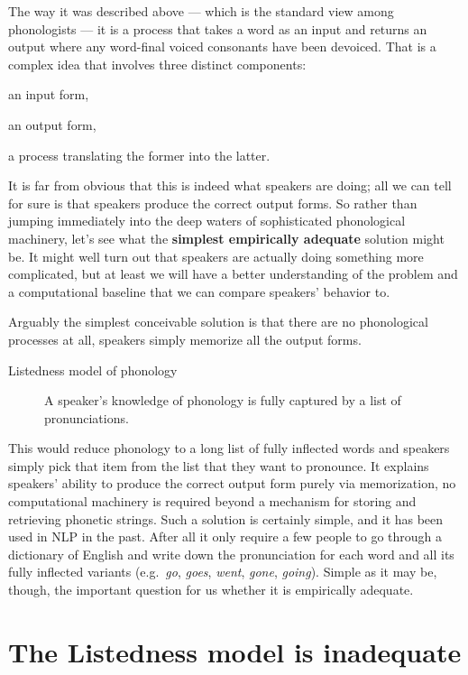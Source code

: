 The way it was described above --- which is the standard view among phonologists --- it is a process that takes a word as an input and returns an output where any word-final voiced consonants have been devoiced.
That is a complex idea that involves three distinct components:
%
\begin{enumerate*}
    \item an input form,
    \item an output form,
    \item a process translating the former into the latter.
\end{enumerate*}
%
It is far from obvious that this is indeed what speakers are doing; all we can tell for sure is that speakers produce the correct output forms.
So rather than jumping immediately into the deep waters of sophisticated phonological machinery, let's see what the \textbf{simplest empirically adequate} solution might be.
It might well turn out that speakers are actually doing something more complicated, but at least we will have a better understanding of the problem and a computational baseline that we can compare speakers' behavior to.

Arguably the simplest conceivable solution is that there are no phonological processes at all, speakers simply memorize all the output forms.
%
\begin{description}
    \item[Listedness model of phonology] A speaker's knowledge of phonology is fully captured by a list of pronunciations.
\end{description}
%
This would reduce phonology to a long list of fully inflected words and speakers simply pick that item from the list that they want to pronounce.
It explains speakers' ability to produce the correct output form purely via memorization, no computational machinery is required beyond a mechanism for storing and retrieving phonetic strings. 
Such a solution is certainly simple, and it has been used in NLP in the past.
After all it only require a few people to go through a dictionary of English and write down the pronunciation for each word and all its fully inflected variants (e.g.\ \emph{go}, \emph{goes}, \emph{went}, \emph{gone}, \emph{going}).
Simple as it may be, though, the important question for us whether it is empirically adequate.


\section{The Listedness model is inadequate}
\label{sec:listphonology_inadequacy}

